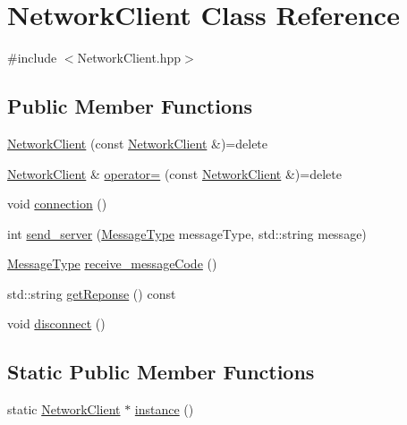 \hypertarget{classNetworkClient}{}\section{Network\+Client Class Reference}
\label{classNetworkClient}


{\ttfamily \#include $<$Network\+Client.\+hpp$>$}

\subsection*{Public Member Functions}
\begin{DoxyCompactItemize}
\item 
\hyperlink{classNetworkClient_a0b95f7c2259c75cf108d5dc9021f3b0f}{Network\+Client} (const \hyperlink{classNetworkClient}{Network\+Client} \&)=delete
\item 
\hyperlink{classNetworkClient}{Network\+Client} \& \hyperlink{classNetworkClient_a81d168b19e4fb79372b8129690946f73}{operator=} (const \hyperlink{classNetworkClient}{Network\+Client} \&)=delete
\item 
void \hyperlink{classNetworkClient_a31ca2c82cc998bc0bccd1252705a86bd}{connection} ()
\item 
int \hyperlink{classNetworkClient_afd8376b194f595c16119c695fd875028}{send\+\_\+server} (\hyperlink{NetworkInterface_8hpp_a36cbd2fb6499765a19ee1942d46c9f1f}{Message\+Type} message\+Type, std\+::string message)
\item 
\hyperlink{NetworkInterface_8hpp_a36cbd2fb6499765a19ee1942d46c9f1f}{Message\+Type} \hyperlink{classNetworkClient_a7d56a3333337b04ec557f0655bebcb28}{receive\+\_\+message\+Code} ()
\item 
std\+::string \hyperlink{classNetworkClient_af565bdc7544ed059d3bc2756d1c227d4}{get\+Reponse} () const
\item 
void \hyperlink{classNetworkClient_a7f69f5c30fd349d670fae18598737b86}{disconnect} ()
\end{DoxyCompactItemize}
\subsection*{Static Public Member Functions}
\begin{DoxyCompactItemize}
\item 
static \hyperlink{classNetworkClient}{Network\+Client} $\ast$ \hyperlink{classNetworkClient_a1fbd2083ac90e4399ad733a0d10ce060}{instance} ()
\end{DoxyCompactItemize}


